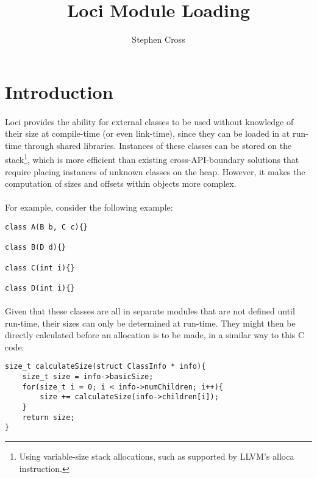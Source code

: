 \documentclass{article}
\title{Loci Module Loading}
\author{Stephen Cross}
\date{}
\begin{document}
\maketitle

\section{Introduction}

\paragraph{}
Loci provides the ability for external classes to be used without knowledge of their size at compile-time (or even link-time), since they can be loaded in at run-time through shared libraries. Instances of these classes can be stored on the stack\footnote{Using variable-size stack allocations, such as supported by LLVM's alloca instruction.}, which is more efficient than existing cross-API-boundary solutions that require placing instances of unknown classes on the heap. However, it makes the computation of sizes and offsets within objects more complex.

\paragraph{}
For example, consider the following example:

\begin{lstlisting}
class A(B b, C c){}

class B(D d){}

class C(int i){}

class D(int i){}
\end{lstlisting}

\paragraph{}
Given that these classes are all in separate modules that are not defined until run-time, their sizes can only be determined at run-time. They might then be directly calculated before an allocation is to be made, in a similar way to this C code:

\begin{lstlisting}
size_t calculateSize(struct ClassInfo * info){
	size_t size = info->basicSize;
	for(size_t i = 0; i < info->numChildren; i++){
		size += calculateSize(info->children[i]);
	}
	return size;
}
\end{lstlisting}
\end{document}
